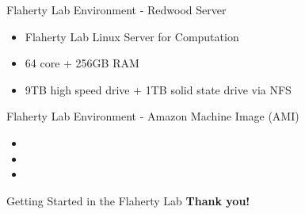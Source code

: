 \documentclass{beamer}
\begin{document}
\begin{frame}{Flaherty Lab Environment - Redwood Server}
	\begin{itemize}
  \item\LARGE{Flaherty Lab Linux Server for Computation}
  \item\LARGE{64 core + 256GB RAM}
  \item\LARGE{9TB high speed drive + 1TB solid state drive via NFS}
	\end{itemize}
\end{frame}

\begin{frame}{Flaherty Lab Environment - Amazon Machine Image (AMI)}
          \begin{itemize}
  \item\LARGE{}
  \item\LARGE{}
  \item\LARGE{}
	 \end{itemize}
\end{frame}

\begin{frame}{Getting Started in the Flaherty Lab}
\LARGE\textbf{Thank you!}
\end{frame}
\end{document}
